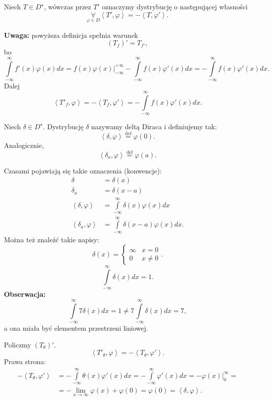 \documentclass[../main.tex]{subfiles}
\begin{document}
\pagebreak
\begin{definicja}
    Niech $T\in D^\star$, wówczas przez $T'$ oznaczymy dystrybucję o następującej własności
    \[
        \underset{\varphi\in D}{\forall} \left<T', \varphi \right> = -\left<T, \varphi' \right>
    .\]
\end{definicja}
\textbf{Uwaga: } powyższa definicja spełnia warunek
\[
    \left( T_f \right)' = T_{f'}
,\]
bo
\[
    \int\limits_{-\infty}^{\infty} f'(x)\varphi(x)dx = f(x)\varphi(x)\Big|_{-\infty}^{+\infty} - \int\limits_{-\infty}^{\infty} f(x)\varphi'(x) dx = -\int\limits_{-\infty}^{\infty} f(x)\varphi'(x)dx
.\]
Dalej
\[
    \left<T'_f, \varphi \right> = -\left<T_{f}, \varphi' \right> = -\int\limits_{-\infty}^{\infty} f(x)\varphi'(x)dx
.\]
\begin{definicja}
    Niech $\delta \in D^\star$. Dystrybucję $\delta$ nazywamy deltą Diraca i definiujemy tak:
    \[
        \left<\delta, \varphi \right> \overset{\text{def}}{=} \varphi(0)
    .\]
Analogicznie,
\[
    \left<\delta_a, \varphi \right>\overset{\text{def}}{=} \varphi(a)
.\]
\end{definicja}
\begin{definicja}
Czasami pojawiają się takie oznaczenia (konwencje):
\begin{align*}
    \delta &= \delta(x)\\
    \delta_a &= \delta(x-a)\\
    \left<\delta, \varphi \right> &= \int\limits_{-\infty}^{\infty} \delta(x)\varphi(x)dx\\
    \left<\delta_a, \varphi \right> &= \int\limits_{-\infty}^{\infty} \delta(x-a)\varphi(x)dx
.\end{align*}
Można też znaleźć takie napisy:
\[
    \delta(x) = \begin{cases}
        \infty & x = 0\\
        0 & x \neq 0
    \end{cases}
.\]
\[
    \int\limits_{-\infty}^{\infty} \delta(x)dx = 1
.\]
\textbf{Obserwacja:}
\[
    \int\limits_{-\infty}^{\infty} 7\delta(x)dx = 1 \neq 7 \int\limits_{-\infty}^{\infty} \delta(x)dx = 7
,\]
a ona miała być elementem przestrzeni liniowej.
\end{definicja}
Policzmy $\left( T_\theta \right)'$.
\[
    \left<T'_{\theta}, \varphi \right> =- \left<T_\theta, \varphi' \right>
.\]
Prawa strona:
\begin{align*}
    -\left<T_\theta, \varphi' \right> &= -\int\limits_{-\infty}^{\infty} \theta(x)\varphi'(x)dx = -\int\limits_{-\infty}^{\infty} \varphi'(x)dx = -\varphi(x)\Big|_{0}^{\infty} =\\
    &= - \lim_{x \to \infty}\varphi(x) + \varphi(0) = \varphi(0) = \left<\delta, \varphi \right>
.\end{align*}
\end{document}
